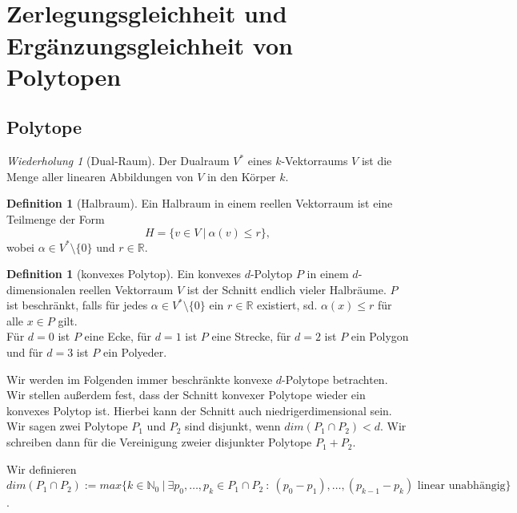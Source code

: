 \documentclass[11pt,titlepage]{article}
\newcommand{\setN}{\mathbb{N}}
\newcommand{\setR}{\mathbb{R}}
\theoremstyle{definition}
\newtheorem{definition}[theorem]{Definition}
\theoremstyle{remark}
\newtheorem*{repetition}{Wiederholung}
\begin{document}
	\newpage \ 
	\thispagestyle{empty}
	\newpage
	\thispagestyle{empty}
	
	\tableofcontents
	
	
	\newpage \
	\thispagestyle{empty} 
	\newpage
	\setcounter{page}{1}
	
	\section{Zerlegungsgleichheit und Ergänzungsgleichheit von Polytopen}
	
	\subsection{Polytope}
	
	\begin{repetition}[Dual-Raum]
		Der Dualraum $V^*$ eines $k$-Vektorraums $V$ ist die Menge aller linearen Abbildungen von $V$ in den Körper 	$k$.
	\end{repetition}
	
	\begin{definition}[Halbraum]
		Ein Halbraum in einem reellen Vektorraum ist eine Teilmenge der Form
		\[ H= \{ v\in V \  \vert\  \alpha(v)\leq r \}, \]
		wobei $\alpha\in V^*\setminus\{0\}$ und $r\in\setR$.
	\end{definition}
	
	\begin{definition}[konvexes Polytop]
		Ein konvexes $d$-Polytop $P$ in einem $d$-dimensionalen reellen Vektorraum $V$ ist der Schnitt endlich vieler 
		Halbräume. $P$ ist beschränkt, falls für jedes $\alpha\in V^*\setminus\{0\}$ ein $r\in \setR$ existiert, sd. 
		$\alpha(x)\leq r$ für alle $x\in P$ gilt. \\
		Für $d=0$ ist $P$ eine Ecke, für $d=1$ ist $P$ eine Strecke, für $d=2$ ist $P$ ein Polygon und für $d=3$ 
		ist $P$ ein Polyeder.
	\end{definition}
	
	Wir werden im Folgenden immer beschränkte konvexe $d$-Polytope betrachten. Wir stellen außerdem fest, dass 
	der Schnitt konvexer Polytope wieder ein konvexes Polytop ist. Hierbei kann der Schnitt auch niedrigerdimensional 
	sein. Wir sagen zwei Polytope $P_1$ und $P_2$ sind disjunkt, wenn $dim(P_1\cap P_2)<d$. Wir schreiben dann 
	für die Vereinigung zweier disjunkter Polytope $P_1+P_2$.
	
	Wir definieren $dim(P_1\cap P_2):=max\{k\in\setN_0\ \vert\ \exists p_0,\ldots,p_k\in P_1\cap P_2\ :
	\ (p_0-p_1),\dots,(p_{k-1}-p_k)\text{ linear unabhängig}\}$.
	
\end{document}
